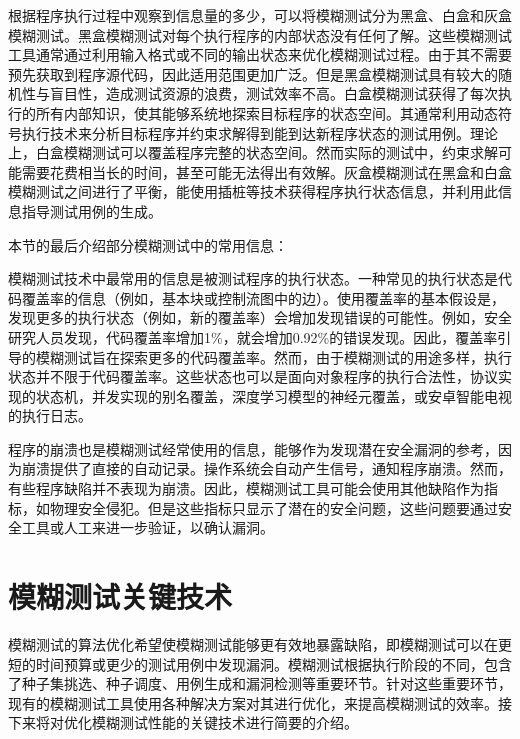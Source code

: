 \documentclass[master]{thesis-uestc}
\begin{document}
根据程序执行过程中观察到信息量的多少，可以将模糊测试分为黑盒、白盒和灰盒模糊测试。黑盒模糊测试对每个执行程序的内部状态没有任何了解。这些模糊测试工具通常通过利用输入格式或不同的输出状态来优化模糊测试过程。由于其不需要预先获取到程序源代码，因此适用范围更加广泛。但是黑盒模糊测试具有较大的随机性与盲目性，造成测试资源的浪费，测试效率不高。白盒模糊测试获得了每次执行的所有内部知识，使其能够系统地探索目标程序的状态空间。其通常利用动态符号执行技术来分析目标程序并约束求解得到能到达新程序状态的测试用例。理论上，白盒模糊测试可以覆盖程序完整的状态空间。然而实际的测试中，约束求解可能需要花费相当长的时间，甚至可能无法得出有效解。灰盒模糊测试在黑盒和白盒模糊测试之间进行了平衡，能使用插桩等技术获得程序执行状态信息，并利用此信息指导测试用例的生成。

本节的最后介绍部分模糊测试中的常用信息：

模糊测试技术中最常用的信息是被测试程序的执行状态。一种常见的执行状态是代码覆盖率的信息（例如，基本块或控制流图中的边）。使用覆盖率的基本假设是，发现更多的执行状态（例如，新的覆盖率）会增加发现错误的可能性。例如，安全研究人员发现，代码覆盖率增加1\%，就会增加0.92\%的错误发现。因此，覆盖率引导的模糊测试旨在探索更多的代码覆盖率。然而，由于模糊测试的用途多样，执行状态并不限于代码覆盖率。这些状态也可以是面向对象程序的执行合法性，协议实现的状态机，并发实现的别名覆盖，深度学习模型的神经元覆盖，或安卓智能电视的执行日志。

程序的崩溃也是模糊测试经常使用的信息，能够作为发现潜在安全漏洞的参考，因为崩溃提供了直接的自动记录。操作系统会自动产生信号，通知程序崩溃。然而，有些程序缺陷并不表现为崩溃。因此，模糊测试工具可能会使用其他缺陷作为指标，如物理安全侵犯。但是这些指标只显示了潜在的安全问题，这些问题要通过安全工具或人工来进一步验证，以确认漏洞。

\section{模糊测试关键技术}

模糊测试的算法优化希望使模糊测试能够更有效地暴露缺陷，即模糊测试可以在更短的时间预算或更少的测试用例中发现漏洞。模糊测试根据执行阶段的不同，包含了种子集挑选、种子调度、用例生成和漏洞检测等重要环节。针对这些重要环节，现有的模糊测试工具使用各种解决方案对其进行优化，来提高模糊测试的效率。接下来将对优化模糊测试性能的关键技术进行简要的介绍。
\end{document}

